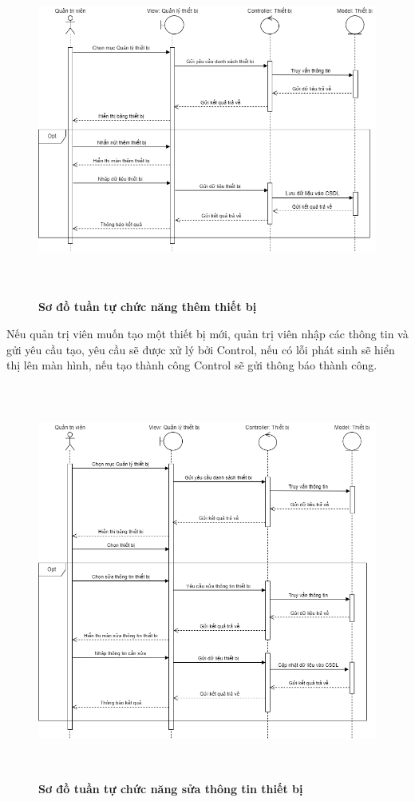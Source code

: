 \begin{figure}[H]
  \centering
  \includegraphics[width=14cm,height=11cm]{Images/sequence/sequence_manage_add_device.png}
  \caption[Sơ đồ tuần tự chức năng thêm thiết bị]{\bfseries \fontsize{12pt}{0pt}
  \selectfont Sơ đồ tuần tự chức năng thêm thiết bị}
  \label{sequence_manage_add_device} %
\end{figure}
Nếu quản trị viên muốn tạo một thiết bị mới, quản trị viên nhập các thông tin và gửi yêu cầu tạo, yêu cầu sẽ được xử lý bởi Control, nếu có lỗi phát sinh sẽ hiển thị lên màn hình, nếu tạo thành công Control 
sẽ gửi thông báo thành công. 
\begin{figure}[H]
  \centering
  \includegraphics[width=14cm,height=13cm]{Images/sequence/sequence_manage_edit_device.png}
  \caption[Sơ đồ tuần tự chức năng sửa thông tin thiết bị]{\bfseries \fontsize{12pt}{0pt}
  \selectfont Sơ đồ tuần tự chức năng sửa thông tin thiết bị}
  \label{sequence_manage_edit_device} %
\end{figure}
